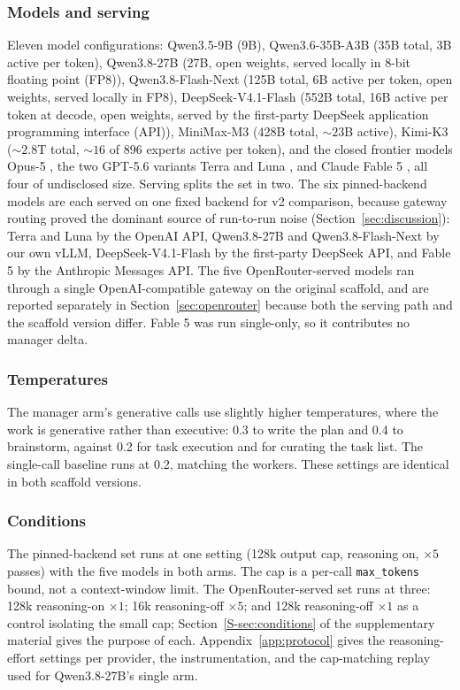 \documentclass[journal]{IEEEtran}
\begin{document}
\subsubsection{Models and serving} Eleven model configurations: Qwen3.5-9B \cite{qwen2026a} (9B),
Qwen3.6-35B-A3B \cite{qwen2026b} (35B total, 3B active per token), Qwen3.8-27B
\cite{qwen2026c} (27B, open weights, served locally in 8-bit floating point (FP8)), Qwen3.8-Flash-Next
\cite{qwen2026d} (125B total, 6B active per token, open weights, served locally in FP8),
DeepSeek-V4.1-Flash \cite{deepseek2026} (552B total, 16B active per token at decode, open
weights, served by the first-party DeepSeek application programming interface (API)), MiniMax-M3 \cite{minimax2026}
(428B total, ${\sim}23$B active), Kimi-K3 \cite{moonshot2026} (${\sim}2.8$T total,
${\sim}16$ of 896 experts active per token), and the closed frontier models Opus-5
\cite{anthropic2026}, the two GPT-5.6 variants Terra and Luna \cite{openai2026}, and Claude
Fable 5 \cite{anthropic2026}, all four of undisclosed size. Serving splits the set in two.
The six pinned-backend models are each served on one fixed backend for v2 comparison, because
gateway routing proved the dominant source of run-to-run noise (Section~\ref{sec:discussion}):
Terra and Luna by the OpenAI API, Qwen3.8-27B and Qwen3.8-Flash-Next by our own vLLM,
DeepSeek-V4.1-Flash by the first-party DeepSeek API, and Fable 5 by the
Anthropic Messages API. The five OpenRouter-served models ran through a
single OpenAI-compatible gateway on the original scaffold, and are reported separately in
Section~\ref{sec:openrouter} because both the serving path and the scaffold version differ.
Fable 5 was run single-only, so it contributes no manager delta.

\subsubsection{Temperatures} The manager arm's generative calls use slightly higher temperatures,
where the work is generative rather than executive: 0.3 to write the plan and 0.4 to brainstorm,
against 0.2 for task execution and for curating the task list. The single-call baseline runs at
0.2, matching the workers. These settings are identical in both scaffold versions.

\subsubsection{Conditions} The pinned-backend set runs at one setting (128k output cap,
reasoning on, $\times 5$ passes) with the five models in both arms. The cap is
a per-call \texttt{max\_tokens} bound, not a context-window limit. The OpenRouter-served set
runs at three: 128k reasoning-on $\times 1$; 16k reasoning-off $\times 5$; and 128k
reasoning-off $\times 1$ as a control isolating the small cap; Section~\ref{S-sec:conditions} of the supplementary material gives the purpose of each. Appendix~\ref{app:protocol}
gives the reasoning-effort settings per provider, the instrumentation, and the cap-matching
replay used for Qwen3.8-27B's single arm.
\end{document}
